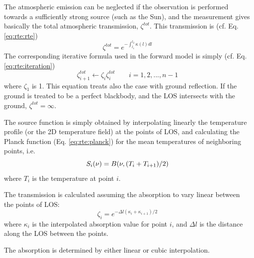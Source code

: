  The atmospheric emission can be neglected if the observation is
 performed towards a sufficiently strong source (such as the Sun), and
 the measurement gives basically the total atmospheric transmission,
 $\zeta^{tot}$. This transmission is (cf.
 Eq. \ref{eq:rte:rte})
 \begin{equation}
   \zeta^{tot} = e^{-\int_{l_1}^{l_2}{\kappa(l)dl}}
  \label{eq:rte:tottrans}
 \end{equation}
 The corresponding iterative formula used in the forward model is
 simply (cf. Eq. \ref{eq:rte:iteration})
 \begin{equation}
   \zeta_{i+1}^{tot} \gets \zeta_{i}\zeta_{i}^{tot}\qquad i=1,2,...,n\!\!-\!\!1
 \end{equation} 
 where $\zeta_1$ is 1. This equation treats also the case with ground 
 reflection. If the ground is treated to be a perfect blackbody, and
 the LOS intersects with the ground, $\zeta^{tot}=\infty$.
 

 \label{sec:rte:calc}
   
 The source function is simply obtained by interpolating linearly the
 temperature profile (or the 2D temperature field) at the points of
 LOS, and calculating the Planck function (Eq. \ref{eq:rte:planck}) for
 the mean temperatures of neighboring points, i.e.
 \begin{equation}
   S_i(\nu) = B(\nu,(T_i+T_{i+1})/2)
  \label{eq:rte:planck2}
 \end{equation}
 where $T_i$ is the temperature at point $i$.
  
 The transmission is calculated assuming the absorption to vary
 linear between the points of LOS:
 \begin{equation}
   \zeta_i = e^{-\Delta l \left(\kappa_i+\kappa_{i+1}\right)/2 }
  \label{eq:rte:transm}
 \end{equation}
 where $\kappa_i$ is the interpolated absorption value for point $i$, and
 $\Delta l$ is the distance along the LOS between the points. 

 The absorption is determined by either linear or cubic interpolation.


